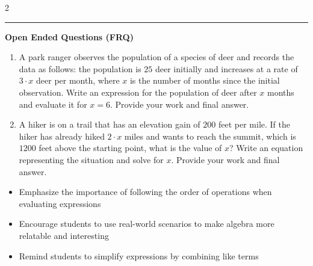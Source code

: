 \documentclass[10pt]{article}
\begin{document}
\begin{multicols}{2}
\begin{enumerate}[label=\textbf{Q\arabic*.}, leftmargin=*, itemsep=6pt, parsep=0pt]
\end{enumerate}
\end{multicols}

\vspace{-0.2cm}
\hrule
\vspace{0.2cm}
\textbf{\small Open Ended Questions (FRQ)}
\begin{enumerate}[label=\textbf{Q\arabic*.}, start=9, itemsep=5pt, topsep=0pt]

  \item \small A park ranger observes the population of a species of deer and records the data as follows: the population is $25$ deer initially and increases at a rate of $3 \cdot x$ deer per month, where $x$ is the number of months since the initial observation. Write an expression for the population of deer after $x$ months and evaluate it for $x = 6$. Provide your work and final answer. \vspace{2cm}

  \item \small A hiker is on a trail that has an elevation gain of $200$ feet per mile. If the hiker has already hiked $2 \cdot x$ miles and wants to reach the summit, which is $1200$ feet above the starting point, what is the value of $x$? Write an equation representing the situation and solve for $x$. Provide your work and final answer. \vspace{2cm}

\end{enumerate}

\vfill

\begin{tcolorbox}[colback=blue!5, colframe=mainblue!50, title=\small \textbf{Chef's Tips}, fonttitle=\bfseries, bottom=1mm]
\begin{itemize}[noitemsep, topsep=2pt, leftmargin=0.5cm]
  \item \scriptsize Emphasize the importance of following the order of operations when evaluating expressions\item \scriptsize Encourage students to use real-world scenarios to make algebra more relatable and interesting\item \scriptsize Remind students to simplify expressions by combining like terms
\end{itemize}
\end{tcolorbox}
\end{document}
